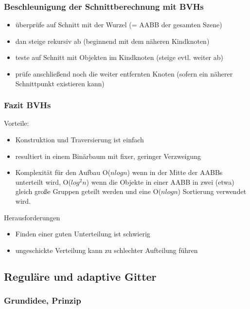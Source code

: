 \documentclass[paper=a4, fontsize=11pt]{scrartcl} %
\numberwithin{equation}{section} %
\numberwithin{figure}{section} %
\numberwithin{table}{section} %
\begin{document}
\subsubsection{Beschleunigung der Schnittberechnung mit BVHs}

\begin{itemize}
\item überprüfe auf Schnitt mit der Wurzel (= AABB der gesamten Szene)
\item dan steige rekursiv ab (beginnend mit dem näheren Kindknoten)
\item teste auf Schnitt mit Objekten im Kindknoten (steige evtl. weiter ab)
\item prüfe anschließend noch die weiter entfernten Knoten (sofern ein näherer Schnittpunkt existieren kann)
\end{itemize}

\subsubsection{Fazit BVHs}

Vorteile: 
\begin{itemize}
\item Konstruktion und Traversierung ist einfach
\item resultiert in einem Binärbaum mit fixer, geringer Verzweigung
\item Komplexität für den Aufbau O($n logn$) wenn in der Mitte der AABBs unterteilt wird, O($log^2 n$) wenn die Objekte in einer AABB in zwei (etwa) gleich große Gruppen geteilt werden und eine O($n log n$) Sortierung verwendet wird.
\end{itemize}

Herausforderungen
\begin{itemize}
\item Finden einer guten Unterteilung ist schwierig
\item ungeschickte Verteilung kann zu schlechter Aufteilung führen
\end{itemize}

\subsection{Reguläre und adaptive Gitter}

\subsubsection{Grundidee, Prinzip}
\end{document}
